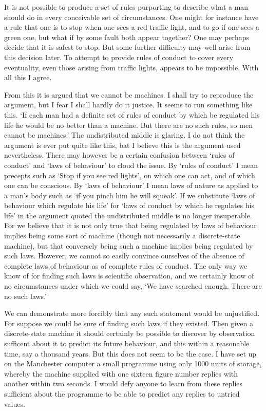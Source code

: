     It is not possible to produce a set of rules purporting to describe what a man should do in every conceivable set of circumstances. One might for instance have a rule that one is to stop when one sees a red traffic light, and to go if one sees a green one, but what if by some fault both appear together? One may perhaps decide that it is safest to stop. But some further difficulty may well arise from this decision later. To attempt to provide rules of conduct to cover every eventuality, even those arising from traffic lights, appears to be impossible. With all this I agree.

    From this it is argued that we cannot be machines. I shall try to reproduce the argument, but I fear I shall hardly do it justice. It seems to run something like this. ‘If each man had a definite set of rules of conduct by which be regulated his life he would be no better than a machine. But there are no such rules, so men cannot be machines.' The undistributed middle is glaring. I do not think the argument is ever put quite like this, bat I believe this is the argument used nevertheless. There may however be a certain confusion between ‘rules of conduct' and ‘laws of behaviour' to cloud the issue. By ‘rules of conduct' I mean precepts such as ‘Stop if you see red lights', on which one can act, and of which one can be conscious. By ‘laws of behaviour' I mean laws of nature as applied to a man's body such as ‘if you pinch him he will squeak'. If we substitute ‘laws of behaviour which regulate his life' for ‘laws of conduct by which he regulates his life' in the argument quoted the undistributed middle is no longer insuperable. For we believe that it is not only true that being regulated by laws of behaviour implies being some sort of machine (though not necessarily a discrete-state machine), but that conversely being such a machine implies being regulated by such laws. However, we cannot so easily convince ourselves of the absence of complete laws of behaviour as of complete rules of conduct. The only way we know of for finding such laws is scientific observation, and we certainly know of no circumstances under which we could say, ‘We have searched enough. There are no such laws.'

    We can demonstrate more forcibly that any such statement would be unjustified. For suppose we could be sure of finding such laws if they existed. Then given a discrete-state machine it should certainly be possible to discover by observation sufficent about it to predict its future behaviour, and this within a reasonable time, say a thousand years. But this does not seem to be the case. I have set up on the Manchester computer a small programme using only 1000 units of storage, whereby the machine supplied with one sixteen figure number replies with another within two seconds. I would defy anyone to learn from these replies sufficient about the programme to be able to predict any replies to untried values.


